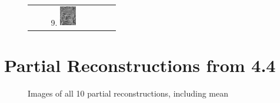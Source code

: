 \documentclass[10pt,a4paper]{article}
\begin{document}
\begin{figure}[h!]
\begin{tabular}{ c c c }
    9. \includegraphics[width=0.25\textwidth]{PrincipalComponent9.jpg}
  \end{tabular}
\end{figure}
\FloatBarrier
\section{Partial Reconstructions from 4.4}
\begin{figure}[h!]
  \caption{Images of all 10 partial reconstructions, including mean}
  \centering
  

\end{figure}
\end{document}
